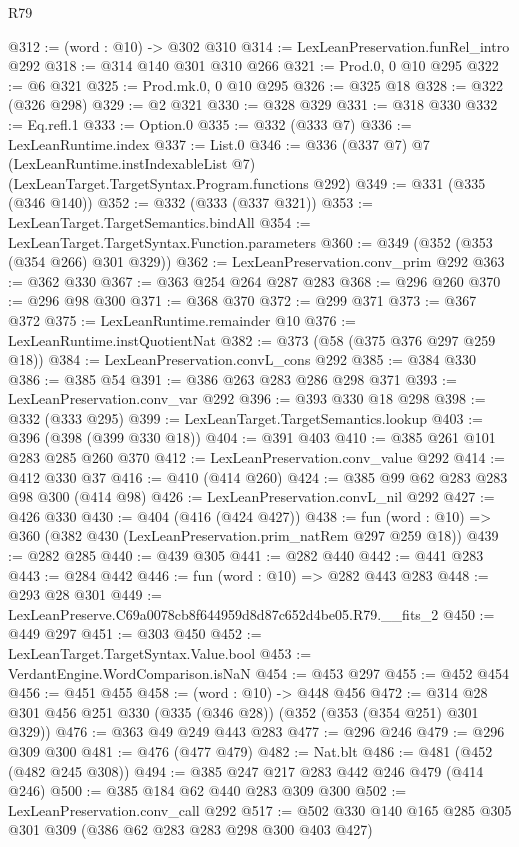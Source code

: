 \begin{lexlean}{R79}
\begin{coremodule}
@312 := (word : @10) -> @302 @310
@314 := LexLeanPreservation.funRel_intro @292
@318 := @314 @140 @301 @310 @266
@321 := Prod.{0, 0} @10 @295
@322 := @6 @321
@325 := Prod.mk.{0, 0} @10 @295
@326 := @325 @18
@328 := @322 (@326 @298)
@329 := @2 @321
@330 := @328 @329
@331 := @318 @330
@332 := Eq.refl.{1}
@333 := Option.{0}
@335 := @332 (@333 @7)
@336 := LexLeanRuntime.index
@337 := List.{0}
@346 := @336
    (@337 @7)
    @7
    (LexLeanRuntime.instIndexableList @7)
    (LexLeanTarget.TargetSyntax.Program.functions @292)
@349 := @331 (@335 (@346 @140))
@352 := @332 (@333 (@337 @321))
@353 := LexLeanTarget.TargetSemantics.bindAll
@354 := LexLeanTarget.TargetSyntax.Function.parameters
@360 := @349 (@352 (@353 (@354 @266) @301 @329))
@362 := LexLeanPreservation.conv_prim @292
@363 := @362 @330
@367 := @363 @254 @264 @287 @283
@368 := @296 @260
@370 := @296 @98 @300
@371 := @368 @370
@372 := @299 @371
@373 := @367 @372
@375 := LexLeanRuntime.remainder @10
@376 := LexLeanRuntime.instQuotientNat
@382 := @373 (@58 (@375 @376 @297 @259 @18))
@384 := LexLeanPreservation.convL_cons @292
@385 := @384 @330
@386 := @385 @54
@391 := @386 @263 @283 @286 @298 @371
@393 := LexLeanPreservation.conv_var @292
@396 := @393 @330 @18 @298
@398 := @332 (@333 @295)
@399 := LexLeanTarget.TargetSemantics.lookup
@403 := @396 (@398 (@399 @330 @18))
@404 := @391 @403
@410 := @385 @261 @101 @283 @285 @260 @370
@412 := LexLeanPreservation.conv_value @292
@414 := @412 @330 @37
@416 := @410 (@414 @260)
@424 := @385 @99 @62 @283 @283 @98 @300 (@414 @98)
@426 := LexLeanPreservation.convL_nil @292
@427 := @426 @330
@430 := @404 (@416 (@424 @427))
@438 := fun (word : @10) => @360 (@382 @430 (LexLeanPreservation.prim_natRem @297 @259 @18))
@439 := @282 @285
@440 := @439 @305
@441 := @282 @440
@442 := @441 @283
@443 := @284 @442
@446 := fun (word : @10) => @282 @443 @283
@448 := @293 @28 @301
@449 := LexLeanPreserve.C69a0078cb8f644959d8d87c652d4be05.R79.__fits_2
@450 := @449 @297
@451 := @303 @450
@452 := LexLeanTarget.TargetSyntax.Value.bool
@453 := VerdantEngine.WordComparison.isNaN
@454 := @453 @297
@455 := @452 @454
@456 := @451 @455
@458 := (word : @10) -> @448 @456
@472 := @314 @28 @301 @456 @251 @330 (@335 (@346 @28)) (@352 (@353 (@354 @251) @301 @329))
@476 := @363 @49 @249 @443 @283
@477 := @296 @246
@479 := @296 @309 @300
@481 := @476 (@477 @479)
@482 := Nat.blt
@486 := @481 (@452 (@482 @245 @308))
@494 := @385 @247 @217 @283 @442 @246 @479 (@414 @246)
@500 := @385 @184 @62 @440 @283 @309 @300
@502 := LexLeanPreservation.conv_call @292
@517 := @502 @330 @140 @165 @285 @305 @301 @309 (@386 @62 @283 @283 @298 @300 @403 @427)

\end{coremodule}
\end{lexlean}
